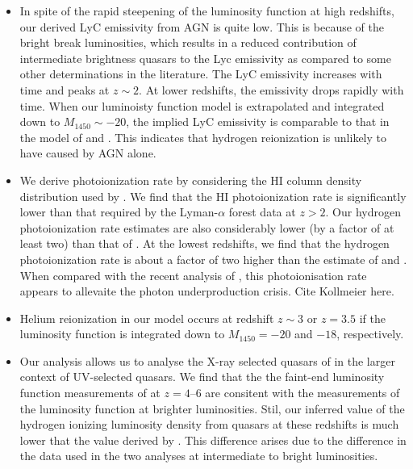 \documentclass[a4paper,fleqn,usenatbib]{mnras}
\begin{document}
\begin{itemize}
\item In spite of the rapid steepening of the luminosity function at
  high redshifts, our derived LyC emissivity from AGN is quite low.
  This is because of the bright break luminosities, which results in a
  reduced contribution of intermediate brightness quasars to the Lyc
  emissivity as compared to some other determinations in the
  literature.  The LyC emissivity increases with time and peaks at
  $z\sim 2$.  At lower redshifts, the emissivity drops rapidly with
  time.  When our luminoisty function model is extrapolated and
  integrated down to $M_{1450}\sim -20$, the implied LyC emissivity is
  comparable to that in the model of \citet{2007ApJ...654..731H} and
  \citet{2012ApJ...746..125H}.  This indicates that hydrogen
  reionization is unlikely to have caused by AGN alone.

\item We derive photoionization rate by considering the HI column
  density distribution used by \citep{2012ApJ...746..125H}.  We find
  that the HI photoionization rate is significantly lower than that
  required by the Lyman-$\alpha$ forest data at $z>2$.  Our hydrogen
  photoionization rate estimates are also considerably lower (by a
  factor of at least two) than that of \citet{2015AA...578A..83G}.  At
  the lowest redshifts, we find that the hydrogen photoionization rate
  is about a factor of two higher than the estimate of
  \citet{2007ApJ...654..731H} and \citet{2012ApJ...746..125H}.  When
  compared with the recent analysis of \citet{2017MNRAS.467.3172G},
  this photoionisation rate appears to allevaite the photon
  underproduction crisis.  Cite Kollmeier here.  
  
\item Helium reionization in our model occurs at redshift $z\sim
  3$ or $z=3.5$ if the luminosity function is integrated down to
  $M_{1450}=-20$ and $-18$, respectively.
  
\item Our analysis allows us to analyse the X-ray selected quasars of
  \citet{2015AA...578A..83G} in the larger context of UV-selected
  quasars.  We find that the the faint-end luminosity function
  measurements of \citet{2015AA...578A..83G} at $z=4$--$6$ are
  consitent with the measurements of the luminosity function at
  brighter luminosities.  Stil, our inferred value of the hydrogen
  ionizing luminosity density from quasars at these redshifts is much
  lower that the value derived by \citet{2015AA...578A..83G}.  This
  difference arises due to the difference in the data used in the two
  analyses at intermediate to bright luminosities.  
\end{itemize}
\end{document}

